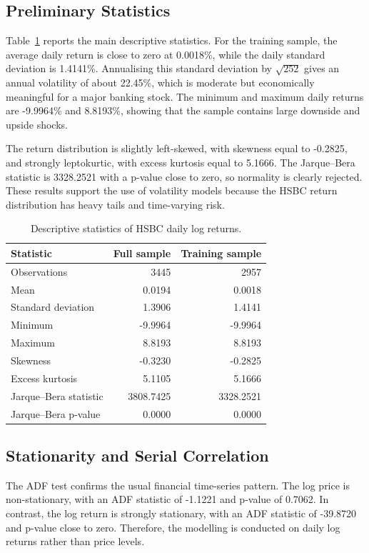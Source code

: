 \documentclass[11pt,a4paper]{article}
\begin{document}
\subsection{Preliminary Statistics}
Table~\ref{tab:hsbc_desc} reports the main descriptive statistics. For the training sample, the average daily return is close to zero at 0.0018\%, while the daily standard deviation is 1.4141\%. Annualising this standard deviation by $\sqrt{252}$ gives an annual volatility of about 22.45\%, which is moderate but economically meaningful for a major banking stock. The minimum and maximum daily returns are -9.9964\% and 8.8193\%, showing that the sample contains large downside and upside shocks.

The return distribution is slightly left-skewed, with skewness equal to -0.2825, and strongly leptokurtic, with excess kurtosis equal to 5.1666. The Jarque--Bera statistic is 3328.2521 with a p-value close to zero, so normality is clearly rejected. These results support the use of volatility models because the HSBC return distribution has heavy tails and time-varying risk.

\begin{table}[htbp]
    \centering
    \caption{Descriptive statistics of HSBC daily log returns.}
    \label{tab:hsbc_desc}
    \begin{tabular}{lrr}
        \hline
        Statistic & Full sample & Training sample \\
        \hline
        Observations & 3445 & 2957 \\
        Mean & 0.0194 & 0.0018 \\
        Standard deviation & 1.3906 & 1.4141 \\
        Minimum & -9.9964 & -9.9964 \\
        Maximum & 8.8193 & 8.8193 \\
        Skewness & -0.3230 & -0.2825 \\
        Excess kurtosis & 5.1105 & 5.1666 \\
        Jarque--Bera statistic & 3808.7425 & 3328.2521 \\
        Jarque--Bera p-value & 0.0000 & 0.0000 \\
        \hline
    \end{tabular}
\end{table}

\subsection{Stationarity and Serial Correlation}
The ADF test confirms the usual financial time-series pattern. The log price is non-stationary, with an ADF statistic of -1.1221 and p-value of 0.7062. In contrast, the log return is strongly stationary, with an ADF statistic of -39.8720 and p-value close to zero. Therefore, the modelling is conducted on daily log returns rather than price levels.
\end{document}
